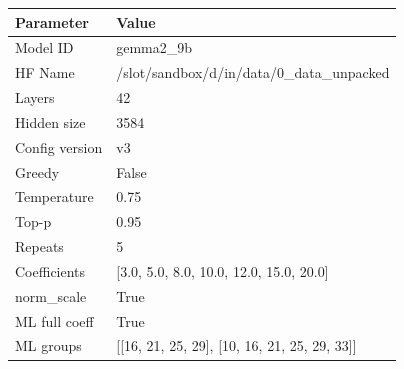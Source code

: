 \begin{tabular}{ll}
\toprule
Parameter & Value \\
\midrule
Model ID & gemma2_9b \\
HF Name & /slot/sandbox/d/in/data/0_data_unpacked \\
Layers & 42 \\
Hidden size & 3584 \\
Config version & v3 \\
Greedy & False \\
Temperature & 0.75 \\
Top-p & 0.95 \\
Repeats & 5 \\
Coefficients & [3.0, 5.0, 8.0, 10.0, 12.0, 15.0, 20.0] \\
norm\_scale & True \\
ML full coeff & True \\
ML groups & [[16, 21, 25, 29], [10, 16, 21, 25, 29, 33]] \\
\bottomrule
\end{tabular}
